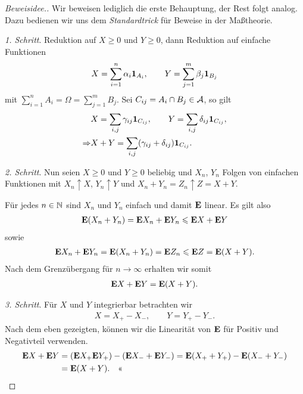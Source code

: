 \begin{proof}[Beweisidee.]
Wir beweisen lediglich die erste Behauptung, der Rest folgt analog. Dazu
bedienen wir uns dem \textit{Standardtrick} für Beweise in der Maßtheorie.

\textit{1. Schritt}. Reduktion auf $X\ge 0$ und $Y\ge 0$, dann Reduktion auf
einfache Funktionen
\begin{align*}
X= \sum\limits_{i=1}^n \alpha_i \Id_{A_i},\qquad Y=
\sum\limits_{j=1}^m \beta_j \Id_{B_j}
\end{align*}
mit $\sum\limits_{i=1}^n A_i = \Omega = \sum\limits_{j=1}^m B_j$. Sei
$C_{ij}=A_i\cap B_j\in \AA$, so gilt
\begin{align*}
&X = \sum\limits_{i,j} \gamma_{ij} \Id_{C_{ij}},\qquad
Y = \sum\limits_{i,j} \delta_{ij} \Id_{C_{ij}},\\
\Rightarrow &
X+Y = \sum\limits_{i,j} (\gamma_{ij}+\delta_{ij})\Id_{C_{ij}}.
\end{align*}

\textit{2. Schritt}. Nun seien $X\ge 0$ und $Y\ge 0$ beliebig und $X_n$, $Y_n$
Folgen von einfachen Funktionen mit $X_n\uparrow X$, $Y_n\uparrow Y$ und
$X_n+Y_n=Z_n\uparrow Z=X+Y$.

Für jedes $n\in\N$ sind $X_n$ und $Y_n$ einfach und damit $\E$ linear. Es gilt
also
\begin{align*}
\E (X_n+Y_n) = \E X_n + \E Y_n \le \E X + \E Y
\end{align*}
sowie
\begin{align*}
\E X_n + \E Y_n  = \E (X_n+Y_n) = \E Z_n \le \E Z = \E (X+ Y).
\end{align*}
Nach dem Grenzübergang für $n\to\infty$ erhalten wir somit
\begin{align*}
\E X + \E Y = \E (X+Y).
\end{align*}

\textit{3. Schritt}. Für $X$ und $Y$ integrierbar betrachten wir
\begin{align*}
X=X_+-X_-,\qquad Y = Y_+-Y_-.
\end{align*}
Nach dem eben gezeigten, können wir die Linearität von $\E$ für Positiv und
Negativteil verwenden.
\begin{align*}
\E X + \E Y &= (\E X_+ \E Y_+) - (\E X_- + \E Y_-)
= \E (X_++Y_+) - \E (X_-+Y_-)\\
&= \E (X+Y).\qedhere
\end{align*}
\end{proof}

